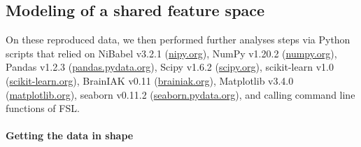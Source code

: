 

\subsection{Modeling of a shared feature space}

On these reproduced data, we then performed further analyses steps via
Python scripts that relied on
%
NiBabel v3.2.1 (\href{https://nipy.org}{\url{nipy.org}}),
%
NumPy v1.20.2 (\href{https://numpy.org}{\url{numpy.org}}),
%
Pandas v1.2.3 (\href{https://pandas.pydata.org}{\url{pandas.pydata.org}}),
%
Scipy v1.6.2 (\href{https://scipy.org}{\url{scipy.org}}),
%
scikit-learn v1.0 (\href{https://scikit-learn.org}{\url{scikit-learn.org}}),
%
BrainIAK v0.11 (\href{https://brainiak.org}{\url{brainiak.org}}),
%
Matplotlib v3.4.0 (\href{https://matplotlib.org}{\url{matplotlib.org}}),
%
seaborn v0.11.2 (\href{https://seaborn.pydata.org}{\url{seaborn.pydata.org}}),
%
and calling command line functions of FSL.








\paragraph{Getting the data in shape}

